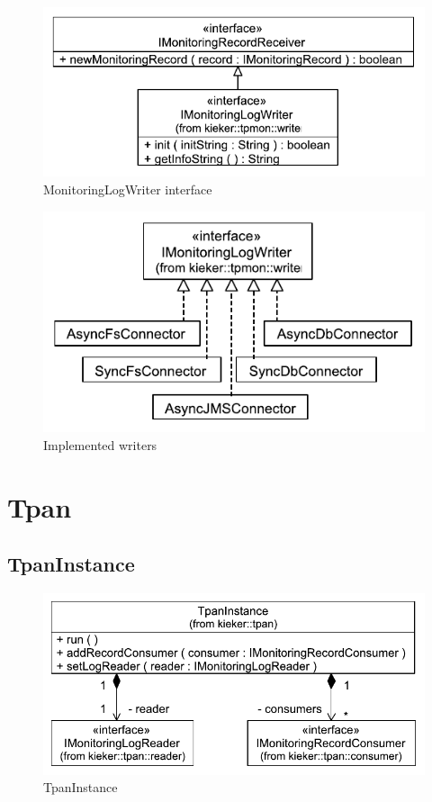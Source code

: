 \documentclass[12pt,journal,a4paper,twocolumn,final,oneside]{IEEEtran}%
\begin{document}
\begin{figure}[h]\centering
\includegraphics[scale=0.65]{figures/model/kieker_KiekerMonitoringLogWriter}%
\caption{MonitoringLogWriter interface}
\end{figure}

\begin{figure}[h]\centering
\includegraphics[scale=0.65]{figures/model/kieker_writerimpls}%
\caption{Implemented writers}
\end{figure}

\section{Tpan}

\subsection{TpanInstance}

\begin{figure}[h]\centering
\includegraphics[scale=0.55]{figures/model/kieker_TpanInstance}%
\caption{TpanInstance}
\end{figure}
\end{document}
